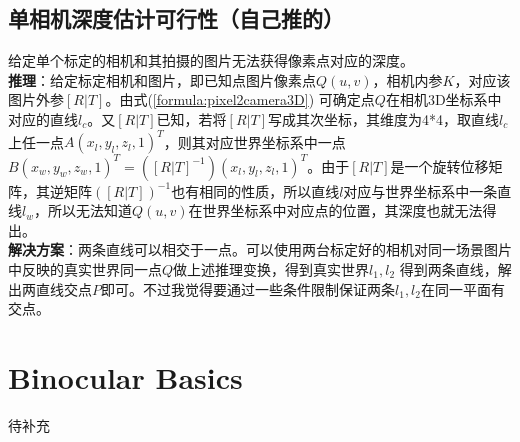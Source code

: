 \documentclass[UTF8]{ctexart}
\begin{document}
\subsection{单相机深度估计可行性（自己推的）}
给定单个标定的相机和其拍摄的图片无法获得像素点对应的深度。\\
\textbf{推理}：给定标定相机和图片，即已知点图片像素点$Q(u,v)$，相机内参$K$，对应该图片外参$[R|T]$。由式(\ref{formula:pixel2camera3D}) 可确定点$Q$在相机3D坐标系中对应的直线$l_c$。又$[R|T]$已知，若将$[R|T]$写成其次坐标，其维度为4*4，取直线$l_c$上任一点$A(x_l,y_l,z_l,1)^T$，则其对应世界坐标系中一点$B(x_w,y_w,z_w,1)^T=([R|T]^{-1})(x_l,y_l,z_l,1)^T$。由于$[R|T]$是一个旋转位移矩阵，其逆矩阵$([R|T])^{-1}$也有相同的性质，所以直线$l$对应与世界坐标系中一条直线$l_w$，所以无法知道$Q(u,v)$在世界坐标系中对应点的位置，其深度也就无法得出。\\
\textbf{解决方案}：两条直线可以相交于一点。可以使用两台标定好的相机对同一场景图片中反映的真实世界同一点$Q$做上述推理变换，得到真实世界$l_1,l_2$ 得到两条直线，解出两直线交点$P$即可。不过我觉得要通过一些条件限制保证两条$l_1,l_2$在同一平面有交点。
\section{Binocular Basics}
待补充
\end{document}
